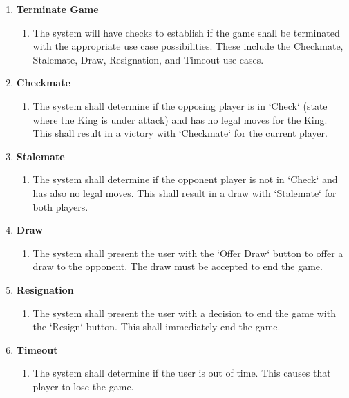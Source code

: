 \documentclass[]{article}
\begin{document}
\begin{enumerate}[{UC}1.]
	\item \textbf{Terminate Game}
	\begin{enumerate}[{FR}1., resume]
	    \item The system will have checks to establish if the game shall be terminated with the appropriate use case possibilities. These include the Checkmate, Stalemate, Draw, Resignation, and Timeout use cases.
	\end{enumerate}
	
	\item \textbf{Checkmate}
	\begin{enumerate}[{FR}1., resume]
		\item The system shall determine if the opposing player is in `Check` \cite{ChessRules} (state where the King is under attack) and has no legal moves for the King. This shall result in a victory with `Checkmate` for the current player.
	\end{enumerate}

	\item \textbf{Stalemate}
	\begin{enumerate}[{FR}1., resume]
		\item The system shall determine if the opponent player is not in `Check` and has also no legal moves. This shall result in a draw with `Stalemate` for both players.
	\end{enumerate}
	
	\item \textbf{Draw}
	\begin{enumerate}[{FR}1., resume]
		\item The system shall present the user with the `Offer Draw` button to offer a draw to the opponent. The draw must be accepted to end the game.
	\end{enumerate}
	
	\item \textbf{Resignation}
	\begin{enumerate}[{FR}1., resume]
	    \item The system shall present the user with a decision to end the game with the `Resign` button. This shall immediately end the game.
	\end{enumerate}
	
	\item \textbf{Timeout}
	\begin{enumerate}[{FR}1., resume]
		\item The system shall determine if the user is out of time. This causes that player to lose the game.
	\end{enumerate}
\end{enumerate}
\end{document}
